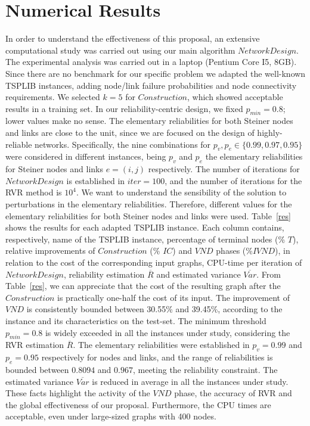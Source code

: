 \documentclass{llncs}
\begin{document}
\section{Numerical Results}\label{results}
In order to understand the effectiveness of this proposal, an extensive computational study was carried out using our main algorithm $NetworkDesign$. The experimental analysis was carried out in a laptop (Pentium Core I5, 8GB). Since there are no benchmark for our specific problem we adapted the well-known TSPLIB instances, adding node/link failure probabilities and node connectivity requirements. We selected $k=5$ for $Construction$, which showed acceptable results in a training set. In our reliability-centric design, we fixed $p_{min}=0.8$; lower values make no sense. The elementary reliabilities for both Steiner nodes and links are close to the unit, since we are focused on the design of highly-reliable networks. Specifically, the nine combinations for $p_{v},p_{e} \in \{0.99, 0.97,0.95\}$ were considered in different instances, being $p_v$ and $p_e$ the elementary reliabilities for Steiner nodes and links $e=(i,j)$ respectively. The number of iterations for $NetworkDesign$ is established in $iter=100$, and the number of iterations for the RVR method is $10^4$. 
We want to understand the sensibility of the solution to perturbations in the elementary reliabilities. 
Therefore, different values for the elementary reliabilities for both Steiner nodes and links were used. Table~\ref{res} shows the results for each adapted TSPLIB instance. Each column contains, respectively, name of the TSPLIB instance, percentage of terminal nodes (\% $T$), 
relative improvements of $Construction$  (\% $IC$) and $VND$ phases (\%$IVND$), in relation to the cost of the corresponding input graphs, CPU-time per iteration of $NetworkDesign$, 
reliability estimation $\overline{R}$ and estimated variance $\overline{Var}$. 
From Table~\ref{res}, we can appreciate that the cost of the resulting graph after the $Construction$ is practically one-half the cost of its input. The improvement of $VND$ is consistently bounded between 30.55\% and 39.45\%, according to the instance and its characteristics on the test-set. The minimum threshold $p_{min}=0.8$ is widely exceeded in all the instances under study, considering the RVR 
estimation $\overline{R}$. The elementary reliabilities were established in $p_v=0.99$ and $p_e=0.95$ respectively for nodes and links, and the range of reliabilities is bounded between $0.8094$ and $0.967$, meeting the reliability constraint. The estimated variance 
$\overline{Var}$ is reduced in average in all the instances under study. These facts highlight the activity of the $VND$ phase, the accuracy of RVR and the global effectiveness of our proposal. Furthermore, the CPU times are acceptable, even under large-sized graphs with 400 nodes.
\end{document}
